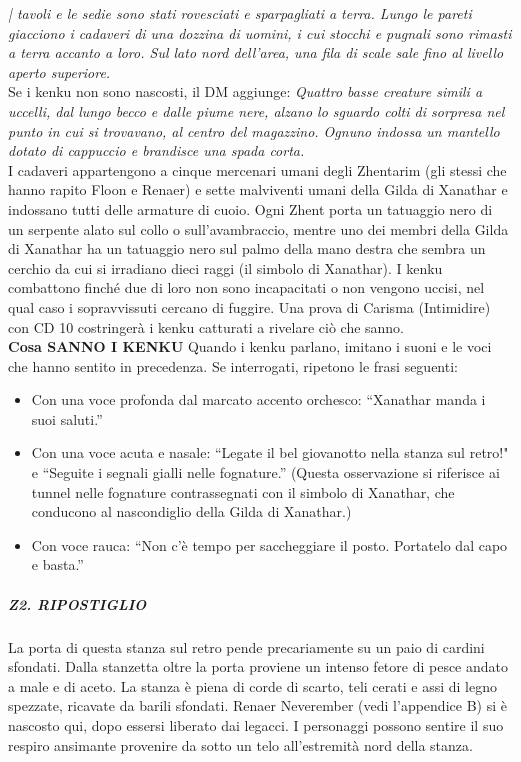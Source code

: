 \documentclass{article}
\begin{document}
\textit{| tavoli e le sedie sono stati rovesciati e sparpagliati a
terra. Lungo le pareti giacciono i cadaveri di una dozzina
di uomini, i cui stocchi e pugnali sono rimasti a terra
accanto a loro. Sul lato nord dell'area, una fila di scale
sale fino al livello aperto superiore.} \\
Se i kenku non sono nascosti, il DM aggiunge:
\textit{Quattro basse creature simili a uccelli, dal lungo becco
e dalle piume nere, alzano lo sguardo colti di sorpresa
nel punto in cui si trovavano, al centro del magazzino.
Ognuno indossa un mantello dotato di cappuccio e
brandisce una spada corta.}\\

I cadaveri appartengono a cinque mercenari umani degli
Zhentarim (gli stessi che hanno rapito Floon e Renaer) e
sette malviventi umani della Gilda di Xanathar e indossano
tutti delle armature di cuoio. Ogni Zhent porta un tatuaggio
nero di un serpente alato sul collo o sull'avambraccio, mentre
uno dei membri della Gilda di Xanathar ha un tatuaggio nero
sul palmo della mano destra che sembra un cerchio da cui si
irradiano dieci raggi (il simbolo di Xanathar).
I kenku combattono finché due di loro non sono
incapacitati o non vengono uccisi, nel qual caso i
sopravvissuti cercano di fuggire. Una prova di Carisma
(Intimidire) con CD 10 costringerà i kenku catturati a
rivelare ciò che sanno. \\

\textbf{Cosa SANNO I KENKU} Quando i kenku parlano, imitano i suoni e le voci che
hanno sentito in precedenza. Se interrogati, ripetono le
frasi seguenti: 
\begin{itemize}
    \item Con una voce profonda dal marcato accento orchesco:
    “Xanathar manda i suoi saluti.”
    \item Con una voce acuta e nasale: “Legate il bel giovanotto
    nella stanza sul retro!" e “Seguite i segnali gialli
    nelle fognature.” (Questa osservazione si riferisce ai
    tunnel nelle fognature contrassegnati con il simbolo di
    Xanathar, che conducono al nascondiglio della Gilda di
    Xanathar.)
    \item Con voce rauca: “Non c'è tempo per saccheggiare il
    posto. Portatelo dal capo e basta.”

\end{itemize}

\subparagraph{Z2. RIPOSTIGLIO}
La porta di questa stanza sul retro pende precariamente
su un paio di cardini sfondati. Dalla stanzetta oltre la
porta proviene un intenso fetore di pesce andato a male e
di aceto. La stanza è piena di corde di scarto, teli cerati e
assi di legno spezzate, ricavate da barili sfondati. Renaer
Neverember (vedi l’appendice B) si è nascosto qui, dopo
essersi liberato dai legacci. I personaggi possono sentire
il suo respiro ansimante provenire da sotto un telo
all'estremità nord della stanza.
\end{document}
